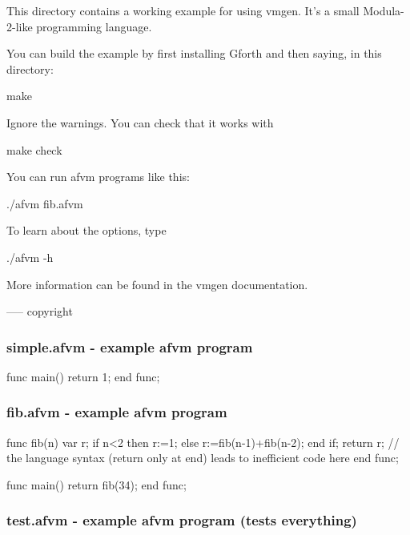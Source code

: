 \documentclass[10pt,english]{article}
\begin{document}
\nwenddocs{}\endmoddef
This directory contains a working example for using vmgen.  It's a
small Modula-2-like programming language.

You can build the example by first installing Gforth and then saying,
in this directory:

make

Ignore the warnings.  You can check that it works with

make check

You can run afvm programs like this:

./afvm fib.afvm

To learn about the options, type

./afvm -h

More information can be found in the vmgen documentation.

-----
\LA{}copyright~{\nwtagstyle{}}\RA{}
\nwendcode{}\nwdocspar


\subsubsection{simple.afvm - example afvm program}

\nwenddocs{}\endmoddef
func main()
  return 1;
end func;
\nwendcode{}\nwdocspar


\subsubsection{fib.afvm - example afvm program}

\nwenddocs{}\endmoddef
func fib(n)
  var r;
  if n<2 then
    r:=1;
  else
    r:=fib(n-1)+fib(n-2);
  end if;
  return r;
  // the language syntax (return only at end) leads to inefficient code here
end func;

func main()
  return fib(34);
end func;
\nwendcode{}\nwdocspar


\subsubsection{test.afvm - example afvm program (tests everything)}
\end{document}

